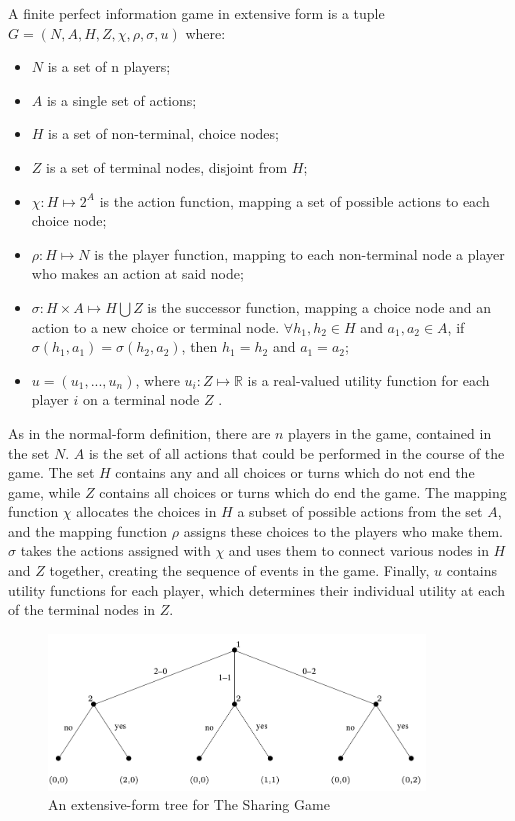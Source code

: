 \begin{define}
  A finite perfect information game in extensive form is a tuple $G = (N, A, H, Z, \chi, \rho, \sigma, u)$ where:
  \begin{itemize}
  \item $N$ is a set of n players;
  \item $A$ is a single set of actions;
  \item $H$ is a set of non-terminal, choice nodes;
  \item $Z$ is a set of terminal nodes, disjoint from $H$;
  \item $\chi: H\mapsto 2^A$ is the action function, mapping a set of possible actions to each choice node;
  \item $\rho: H\mapsto N$ is the player function, mapping to each non-terminal node a player who makes an action at said node;
  \item $\sigma: H\times A\mapsto H\bigcup Z$ is the successor function, mapping a choice node and an action to a new choice or terminal node. $\forall h_1, h_2\in H$ and $a_1, a_2\in A$, if $\sigma(h_1, a_1)=\sigma(h_2, a_2)$, then $h_1=h_2$ and $a_1=a_2$;
  \item $u=(u_1,...,u_n)$, where $u_i:Z\mapsto \mathbb{R}$ is a real-valued utility function for each player $i$ on a terminal node $Z$ \cite{shoh09}.
  \end{itemize}
\end{define}

As in the normal-form definition, there are $n$ players in the game, contained in the set $N$. $A$ is the set of all actions that could be performed in the course of the game. The set $H$ contains any and all choices or turns which do not end the game, while $Z$ contains all choices or turns which do end the game. The mapping function $\chi$ allocates the choices in $H$ a subset of possible actions from the set $A$, and the mapping function $\rho$ assigns these choices to the players who make them. $\sigma$ takes the actions assigned with $\chi$ and uses them to connect various nodes in $H$ and $Z$ together, creating the sequence of events in the game. Finally, $u$ contains utility functions for each player, which determines their individual utility at each of the terminal nodes in $Z$.\\

\begin{figure}[H]
  \centering
  \includegraphics[width=10cm]{figures/ExampleTree.png}
  \caption{An extensive-form tree for The Sharing Game \cite{shoh09}}
  \label{fig:sharingTree}
\end{figure}

